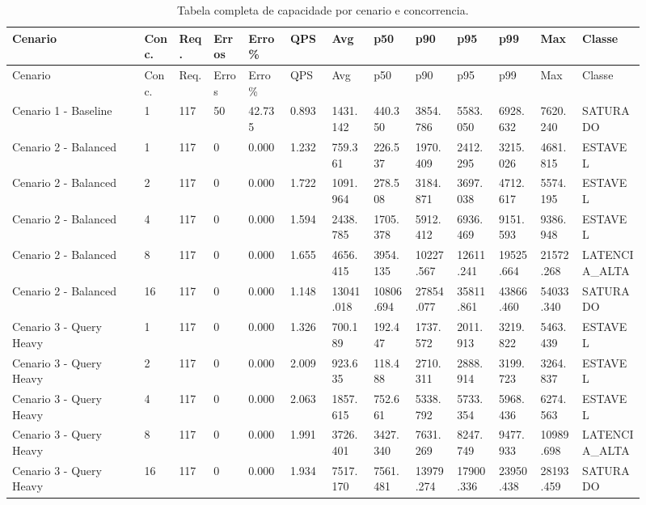 \begin{landscape}
{
\scriptsize
\setlength{\tabcolsep}{4pt}
\renewcommand{\arraystretch}{1.15}
\begin{longtable}{p{0.19\linewidth}p{0.05\linewidth}p{0.05\linewidth}p{0.05\linewidth}p{0.06\linewidth}p{0.06\linewidth}p{0.06\linewidth}p{0.06\linewidth}p{0.06\linewidth}p{0.06\linewidth}p{0.06\linewidth}p{0.06\linewidth}p{0.09\linewidth}}
\caption{Tabela completa de capacidade por cenario e concorrencia.}\\
\toprule
Cenario & Conc. & Req. & Erros & Erro \% & QPS & Avg & p50 & p90 & p95 & p99 & Max & Classe \\
\midrule
\endfirsthead
\toprule
Cenario & Conc. & Req. & Erros & Erro \% & QPS & Avg & p50 & p90 & p95 & p99 & Max & Classe \\
\midrule
\endhead
Cenario 1 - Baseline & 1 & 117 & 50 & 42.735 & 0.893 & 1431.142 & 440.350 & 3854.786 & 5583.050 & 6928.632 & 7620.240 & SATURADO \\
Cenario 2 - Balanced & 1 & 117 & 0 & 0.000 & 1.232 & 759.361 & 226.537 & 1970.409 & 2412.295 & 3215.026 & 4681.815 & ESTAVEL \\
Cenario 2 - Balanced & 2 & 117 & 0 & 0.000 & 1.722 & 1091.964 & 278.508 & 3184.871 & 3697.038 & 4712.617 & 5574.195 & ESTAVEL \\
Cenario 2 - Balanced & 4 & 117 & 0 & 0.000 & 1.594 & 2438.785 & 1705.378 & 5912.412 & 6936.469 & 9151.593 & 9386.948 & ESTAVEL \\
Cenario 2 - Balanced & 8 & 117 & 0 & 0.000 & 1.655 & 4656.415 & 3954.135 & 10227.567 & 12611.241 & 19525.664 & 21572.268 & LATENCIA\_ALTA \\
Cenario 2 - Balanced & 16 & 117 & 0 & 0.000 & 1.148 & 13041.018 & 10806.694 & 27854.077 & 35811.861 & 43866.460 & 54033.340 & SATURADO \\
Cenario 3 - Query Heavy & 1 & 117 & 0 & 0.000 & 1.326 & 700.189 & 192.447 & 1737.572 & 2011.913 & 3219.822 & 5463.439 & ESTAVEL \\
Cenario 3 - Query Heavy & 2 & 117 & 0 & 0.000 & 2.009 & 923.635 & 118.488 & 2710.311 & 2888.914 & 3199.723 & 3264.837 & ESTAVEL \\
Cenario 3 - Query Heavy & 4 & 117 & 0 & 0.000 & 2.063 & 1857.615 & 752.661 & 5338.792 & 5733.354 & 5968.436 & 6274.563 & ESTAVEL \\
Cenario 3 - Query Heavy & 8 & 117 & 0 & 0.000 & 1.991 & 3726.401 & 3427.340 & 7631.269 & 8247.749 & 9477.933 & 10989.698 & LATENCIA\_ALTA \\
Cenario 3 - Query Heavy & 16 & 117 & 0 & 0.000 & 1.934 & 7517.170 & 7561.481 & 13979.274 & 17900.336 & 23950.438 & 28193.459 & SATURADO \\
\bottomrule
\end{longtable}
}
\end{landscape}
